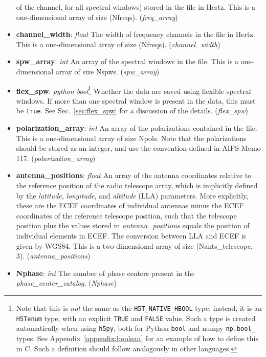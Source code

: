 \documentclass[11pt, oneside]{article}
\begin{document}
\begin{itemize}
  of the channel, for all spectral windows) stored in the file in Hertz. This is a
  one-dimensional array of size (Nfreqs). (\textit{freq\_array})
\item \textbf{channel\_width}: \textit{float} The width of frequency channels in
  the file in Hertz. This is a one-dimensional array of size
  (Nfreqs). (\textit{channel\_width})
\item \textbf{spw\_array}: \textit{int} An array of the spectral windows in the
  file. This is a one-dimensional array of size Nspws. (\textit{spw\_array})
\item \textbf{flex\_spw}: \textit{python bool}\footnote{Note that this is
    \textit{not} the same as the \texttt{H5T\_NATIVE\_HBOOL} type; instead, it
    is an \texttt{H5Tenum} type, with an explicit \texttt{TRUE} and
    \texttt{FALSE} value. Such a type is created automatically when using
    \texttt{h5py}, both for Python \texttt{bool} and numpy \texttt{np.bool\_}
    types. See Appendix~\ref{appendix:boolean} for an example of how to define
    this in C. Such a definition should follow analogously in other languages.}
  Whether the data are saved using flexible spectral windows. If more than one
  spectral window is present in the data, this must be \texttt{True}. See
  Sec.~\ref{sec:flex_spw} for a discussion of the details. (\textit{flex\_spw})
\item \textbf{polarization\_array}: \textit{int} An array of the polarizations
  contained in the file. This is a one-dimensional array of size Npols. Note
  that the polarizations should be stored as an integer, and use the convention
  defined in AIPS Memo 117. (\textit{polarization\_array})
\item \textbf{antenna\_positions}: \textit{float} An array of the antenna
  coordinates relative to the reference position of the radio telescope array,
  which is implicitly defined by the \textit{latitude}, \textit{longitude}, and
  \textit{altitude} (LLA) parameters. More explicitly, these are the ECEF
  coordinates of individual antennas minus the ECEF coordinates of the reference
  telescope position, such that the telescope position plus the values stored in
  \textit{antenna\_positions} equals the position of individual elements in
  ECEF. The conversion between LLA and ECEF is given by WGS84. This is a
  two-dimensional array of size (Nants\_telescope,
  3). (\textit{antenna\_positions})
\item \textbf{Nphase}: \textit{int} The number of phase centers present in the
  \textit{phase\_center\_catalog}. (\textit{Nphase})

\end{itemize}
\end{document}
